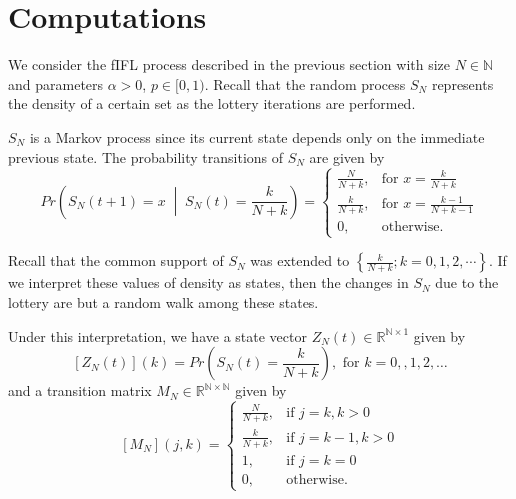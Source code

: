 \documentclass{article}
\newcommand{\N}{\mathbb{N}}
\newcommand{\R}{\mathbb{R}}
\newcommand{\sset}[1]{\left\{ #1 \right\}}
\newcommand{\ppar}[1]{\left( #1 \right)}
\newcommand{\spar}[1]{\left[ #1 \right]}
\begin{document}

\section{Computations}

We consider the fIFL process described in the previous section with size $N\in \N$ and parameters $\alpha>0$, $p\in [0,1)$. 
Recall that the random process $S_N$ represents the density of a certain set as the lottery iterations are performed.

$S_N$ is a Markov process since its current state depends only on the immediate previous state. The probability transitions of $S_N$ are given by
\begin{equation}
    Pr\ppar{S_N(t+1) = x \;\middle|\; S_N(t) = \frac{k}{N+k}} = 
    \begin{cases}
        \frac{N}{N+k}, &\text{for } x= \frac{k}{N+k} \\
        \frac{k}{N+k}, &\text{for } x= \frac{k-1}{N+k-1} \\
        0, &\text{otherwise.}
    \end{cases}
\end{equation}

Recall that the common support of $S_N$ was extended  to $\sset{\frac{k}{N+k}; k = 0, 1, 2, \cdots}$.
If we interpret these values of density as states, then the changes in $S_N$ due to the lottery are but a random walk among these states.

Under this interpretation, we have a state vector $Z_N(t) \in \R^{\N\times 1}$ given by
\begin{equation}
    \spar{Z_N(t)}(k) = Pr\ppar{S_N(t) = \frac{k}{N+k}}, \text{ for } k=0,,1, 2, \dots
\end{equation}
and a transition matrix $M_N\in \R^{\N\times \N}$ given by
\begin{equation}
    \spar{M_N}(j,k) = 
    \begin{cases}
        \frac{N}{N+k}, &\text{if } j= k, k>0 \\
        \frac{k}{N+k}, &\text{if } j= k-1, k>0 \\
        1, &\text{if } j= k=0 \\
        0, &\text{otherwise.}
    \end{cases}
\end{equation}
\end{document}
